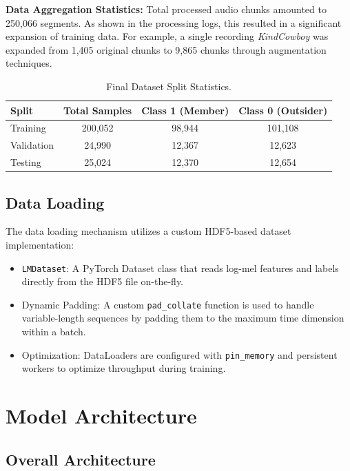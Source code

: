 \documentclass[12pt,a4paper]{article}
\begin{document}
\textbf{Data Aggregation Statistics:}
Total processed audio chunks amounted to 250,066 segments.
As shown in the processing logs, this resulted in a significant expansion of training data.
For example, a single recording \textit{KindCowboy} was expanded from 1,405 original chunks to 9,865 chunks through augmentation techniques.

\begin{table}[h]
\centering
\begin{tabular}{l|c|c|c}
\textbf{Split} & \textbf{Total Samples} & \textbf{Class 1 (Member)} & \textbf{Class 0 (Outsider)} \\ \hline
Training & 200,052 & 98,944 & 101,108 \\
Validation & 24,990 & 12,367 & 12,623 \\
Testing & 25,024 & 12,370 & 12,654 \\
\end{tabular}
\caption{Final Dataset Split Statistics.}
\label{tab:dataset_stats}
\end{table}


\subsection{Data Loading}

The data loading mechanism utilizes a custom HDF5-based dataset implementation:

\begin{itemize}
\item \texttt{LMDataset}: A PyTorch Dataset class that reads log-mel features and labels directly from the HDF5 file on-the-fly.
\item Dynamic Padding: A custom \texttt{pad\_collate} function is used to handle variable-length sequences by padding them to the maximum time dimension within a batch.
\item Optimization: DataLoaders are configured with \texttt{pin\_memory} and persistent workers to optimize throughput during training.
\end{itemize}



\section{Model Architecture}

\subsection{Overall Architecture}
\end{document}
